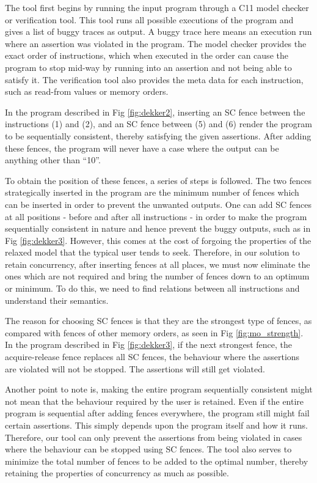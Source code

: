 The tool first begins by running the input program through a C11 model checker or verification tool. This tool runs all possible executions of the program and gives a list of buggy traces as output. A buggy trace here means an execution run where an assertion was violated in the program. The model checker provides the exact order of instructions, which when executed in the order can cause the program to stop mid-way by running into an assertion and not being able to satisfy it. The verification tool also provides the meta data for each instruction, such as read-from values or memory orders.

In the program described in Fig \ref{fig:dekker2}, inserting an SC fence between the instructions (1) and (2), and an SC fence between (5) and (6) render the program to be sequentially consistent, thereby satisfying the given assertions. After adding these fences, the program will never have a case where the output can be anything other than ``10''.

To obtain the position of these fences, a series of steps is followed. The two fences strategically inserted in the program are the minimum number of fences which can be inserted in order to prevent the unwanted outputs. One can add SC fences at all positions - before and after all instructions - in order to make the program sequentially consistent in nature and hence prevent the buggy outputs, such as in Fig \ref{fig:dekker3}. However, this comes at the cost of forgoing the properties of the relaxed model that the typical user tends to seek. Therefore, in our solution to retain concurrency, after inserting fences at all places, we must now eliminate the ones which are not required and bring the number of fences down to an optimum or minimum. To do this, we need to find relations between all instructions and understand their semantics.

The reason for choosing SC fences is that they are the strongest type of fences, as compared with fences of other memory orders, as seen in Fig \ref{fig:mo_strength}. In the program described in Fig \ref{fig:dekker3}, if the next strongest fence, the acquire-release fence replaces all SC fences, the behaviour where the assertions are violated will not be stopped. The assertions will still get violated.

Another point to note is, making the entire program sequentially consistent might not mean that the behaviour required by the user is retained. Even if the entire program is sequential after adding fences everywhere, the program still might fail certain assertions. This simply depends upon the program itself and how it runs. Therefore, our tool can only prevent the assertions from being violated in cases where the behaviour can be stopped using SC fences. The tool also serves to minimize the total number of fences to be added to the optimal number, thereby retaining the properties of concurrency as much as possible.

